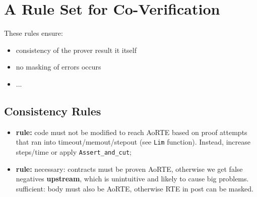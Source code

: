 
\section{A Rule Set for Co-Verification}
These rules ensure: 
\begin{itemize}
\item consistency of the prover result it itself
\item no masking of errors occurs
\item ...
\end{itemize}

\subsection{Consistency Rules}

\begin{itemize}
\item \textbf{rule:} code must not be modified to reach AoRTE based on proof attempts that ran into timeout/memout/stepout (see \texttt{Lim} function). Instead, increase steps/time or apply \texttt{Assert\_and\_cut};
\item \textbf{rule:} necessary: contracts must be proven AoRTE,
  otherwise we get false negatives \textbf{upstream}, which is
  unintuitive and likely to cause big problems. sufficient: body must
  also be AoRTE, otherwise RTE in post can be masked.



\end{itemize}
